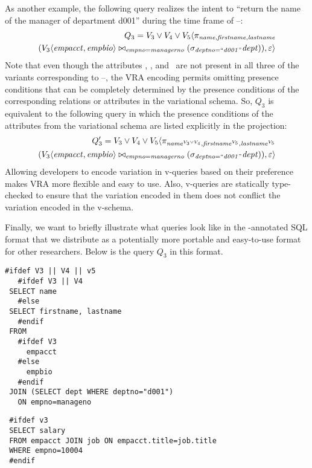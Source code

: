 As another example, the following query realizes the intent to ``return the
name of the manager of department d001'' during the time frame of
\vThree--\vFive:
%
\begin{align*}
Q_3 = \vThree\vee\vFour\vee\vFive \langle
  \pi_{\name,\fname,\lname} 
  \\
(\joinRel{\chc[\vThree]{\empacct,\empbio}}{(\vSel[\deptno=\deptOne]{\dept})}
           {\empno=\managerno}),
  \empRel \rangle
\end{align*}
%
\noindent
Note that even though the attributes \name, \fname, and \lname\ are not present
in all three of the variants corresponding to \vThree--\vFive, the VRA encoding
permits omitting presence conditions that can be completely determined by the
presence conditions of the corresponding relations or attributes in the
variational schema. So, $Q_3$ is equivalent to the following query in which the
presence conditions of the attributes from the variational schema are listed
explicitly in the projection:
%
\begin{align*}
Q_3' = \vThree\vee\vFour\vee\vFive \langle
  \pi_{\oatt{\name}{\vThree\vee\vFour},\oatt{\fname}{\vFive},\oatt{\lname}{\vFive}} 
  \\
  (\joinRel{\chc[\vThree]{\empacct,\empbio}}{(\vSel[\deptno=\deptOne]{\dept})}
           {\empno=\managerno}),
  \empRel \rangle
\end{align*}
%
%
 \noindent
Allowing developers to encode variation in v-queries based on their
preference makes VRA more flexible and easy to use. 
Also, v-queries are statically type-checked to ensure that
the variation encoded in them does not conflict the variation encoded
in the v-schema. 

 Finally, we want to briefly illustrate what queries look like in the
 -annotated SQL format that we distribute as a potentially more
 portable and easy-to-use format for other researchers. Below is the query $Q_3$
 in this format.
 
 \begin{lstlisting}[language={}]
 #ifdef V3 || V4 || v5
   #ifdef V3 || V4
 SELECT name
   #else
 SELECT firstname, lastname
   #endif
 FROM
   #ifdef V3
     empacct
   #else
     empbio
   #endif
 JOIN (SELECT dept WHERE deptno="d001")
   ON empno=manageno  
 \end{lstlisting}

 \begin{lstlisting}
 #ifdef v3
 SELECT salary
 FROM empacct JOIN job ON empacct.title=job.title
 WHERE empno=10004 
 #endif
 \end{lstlisting}

%

